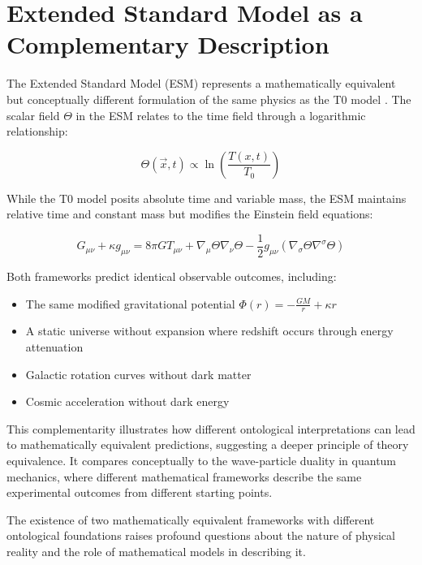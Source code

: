 \documentclass[12pt,a4paper]{article}
\newcommand{\Tfieldt}{T(x,t)}
\newcommand{\Tzero}{T_0}
\newcommand{\vecx}{\vec{x}}
\begin{document}
	\section{Extended Standard Model as a Complementary Description}
	\label{sec:esm}
	
	The Extended Standard Model (ESM) represents a mathematically equivalent but conceptually different formulation of the same physics as the T0 model \cite{pascher_esm_comparison_2025}. The scalar field $\Theta$ in the ESM relates to the time field through a logarithmic relationship:
	
	\begin{equation}
		\Theta(\vecx,t) \propto \ln\left(\frac{\Tfieldt}{\Tzero}\right)
		\label{eq:theta_relation}
	\end{equation}
	
	While the T0 model posits absolute time and variable mass, the ESM maintains relative time and constant mass but modifies the Einstein field equations:
	
	\begin{equation}
		G_{\mu\nu} + \kappa g_{\mu\nu} = 8\pi G T_{\mu\nu} + \nabla_{\mu}\Theta\nabla_{\nu}\Theta - \frac{1}{2}g_{\mu\nu}(\nabla_{\sigma}\Theta\nabla^{\sigma}\Theta)
		\label{eq:modified_einstein}
	\end{equation}
	
	Both frameworks predict identical observable outcomes, including:
	
	\begin{itemize}
		\item The same modified gravitational potential $\Phi(r) = -\frac{GM}{r} + \kappa r$
		\item A static universe without expansion where redshift occurs through energy attenuation
		\item Galactic rotation curves without dark matter
		\item Cosmic acceleration without dark energy
	\end{itemize}
	
	This complementarity illustrates how different ontological interpretations can lead to mathematically equivalent predictions, suggesting a deeper principle of theory equivalence. It compares conceptually to the wave-particle duality in quantum mechanics, where different mathematical frameworks describe the same experimental outcomes from different starting points.
	
	The existence of two mathematically equivalent frameworks with different ontological foundations raises profound questions about the nature of physical reality and the role of mathematical models in describing it.
	
\end{document}
